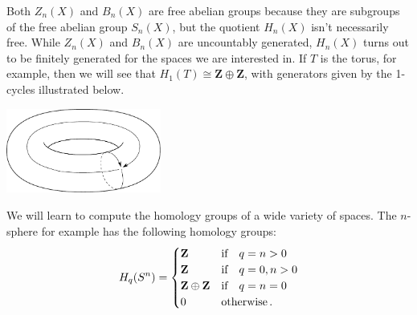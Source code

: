 Both $Z_n(X)$ and $B_n(X)$ are free abelian groups because they are subgroups of the free abelian group $S_n(X)$, but the quotient $H_n(X)$ isn't necessarily free. While $Z_n(X)$ and $B_n(X)$ are uncountably generated, $H_n(X)$ turns out to be finitely generated for the spaces we are interested in. If $T$ is the torus, for example, then we will see that $H_1(T) \cong \mathbf{Z} \oplus \mathbf{Z}$, with generators given by the 1-cycles illustrated below. 

\medskip
\begin{center}
\includegraphics[width=2in]{905/Figures/01-torus-generating-cycles}
\end{center}

\medskip
We will learn to compute the homology groups of a wide variety of spaces. 
The $n$-sphere for example has the following homology groups:
\[
H_q(S^n)=\begin{cases}\mathbf Z & \hbox{if}\quad q=n>0\\
                \mathbf Z & \hbox{if}\quad q=0,n>0\\
                \mathbf Z\oplus\mathbf Z & \hbox{if}\quad q=n=0\\
                0 & \hbox{otherwise}\,.
\end{cases}
\]





